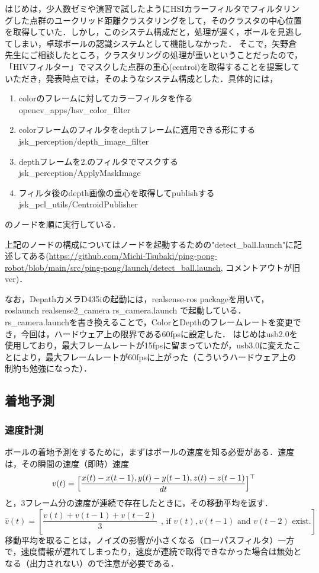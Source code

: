 \documentclass[10pt, oneside, titlepage]{ltjarticle}  %
\begin{document}
  はじめは，少人数ゼミや演習で試したようにHSIカラーフィルタでフィルタリングした点群のユークリッド距離クラスタリングをして，そのクラスタの中心位置を取得していた\cite{detect2}．しかし，このシステム構成だと，処理が遅く，ボールを見逃してしまい，卓球ボールの認識システムとして機能しなかった．
  そこで，矢野倉先生にご相談したところ，クラスタリングの処理が重いということだったので，「HIVフィルター」でマスクした点群の重心(centroi)を取得することを提案していただき\cite{detect1}，発表時点では，そのようなシステム構成とした．具体的には，
  \begin{enumerate}
  \item colorのフレームに対してカラーフィルタを作る \\
  opencv\_apps/hsv\_color\_filter
  \item colorフレームのフィルタをdepthフレームに適用できる形にする \\
  jsk\_perception/depth\_image\_filter
  \item depthフレームを2.のフィルタでマスクする \\
  jsk\_perception/ApplyMaskImage
  \item フィルタ後のdepth画像の重心を取得してpublishする \\
  jsk\_pcl\_utils/CentroidPublisher
  \end{enumerate}
  のノードを順に実行している．

  上記のノードの構成についてはノードを起動するための"detect\_ball.launch"に記述してある(\url{https://github.com/Michi-Tsubaki/ping-pong-robot/blob/main/src/ping-pong/launch/detect_ball.launch}, コメントアウトが旧ver)．

  なお，DepathカメラD435iの起動には，realsense-ros packageを用いて，roslaunch realsense2\_camera rs\_camera.launch で起動している．rs\_camera.launchを書き換えることで，ColorとDepthのフレームレートを変更でき，今回は，ハードウェア上の限界である60fpsに設定した．\cite{detect3}
  はじめはusb2.0を使用しており，最大フレームレートが15fpsに留まっていたが，usb3.0に変えたことにより，最大フレームレートが60fpsに上がった（こういうハードウェア上の制約も勉強になった）．
  \subsection{着地予測}
    \subsubsection{速度計測}
    ボールの着地予測をするために，まずはボールの速度を知る必要がある．速度は，その瞬間の速度（即時）速度
    \[v(t)=\Bigl[\frac{x(t)-x(t-1), y(t)-y(t-1), z(t)-z(t-1)}{dt}\Bigl]^\top\]
    と，3フレーム分の速度が連続で存在したときに，その移動平均を返す．
    \[\hat{v}(t)=[\frac{v(t)+v(t-1)+v(t-2)}{3}~~\mbox{, if } v(t) , v(t-1) \mbox{ and } v(t-2) \mbox{ exist.}]\]
    移動平均を取ることは，ノイズの影響が小さくなる（ローパスフィルタ）一方で，速度情報が遅れてしまったり，速度が連続で取得できなかった場合は無効となる（出力されない）ので注意が必要である．
\end{document}
